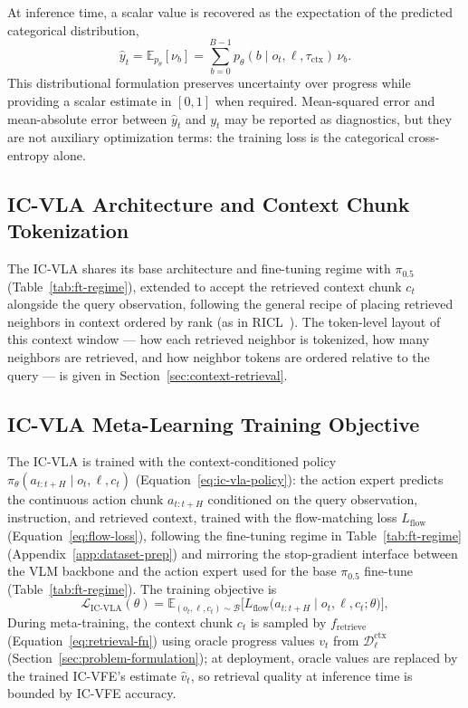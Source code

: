 At inference time, a scalar value is recovered as the expectation of the predicted
categorical distribution,
\begin{equation}
    \hat{y}_t = \mathbb{E}_{p_\theta}[\nu_b] = \sum_{b=0}^{B-1} p_\theta(b \mid o_t, \ell, \tau_{\text{ctx}})\, \nu_b .
\end{equation}
This distributional formulation preserves uncertainty over progress while providing a
scalar estimate in $[0, 1]$ when required. Mean-squared error and mean-absolute error
between $\hat{y}_t$ and $y_t$ may be reported as diagnostics, but they are not
auxiliary optimization terms: the training loss is the categorical cross-entropy
alone.

\subsection{IC-VLA Architecture and Context Chunk Tokenization}
\label{sec:ic-vla-architecture}

The IC-VLA shares its base architecture and fine-tuning regime with $\pi_{0.5}$
(Table~\ref{tab:ft-regime}), extended to accept the retrieved context chunk $c_t$
alongside the query observation, following the general recipe of placing retrieved
neighbors in context ordered by rank (as in RICL~\cite{ricl}). The
token-level layout of this context window --- how each retrieved neighbor is
tokenized, how many neighbors are retrieved, and how neighbor tokens are ordered
relative to the query --- is given in Section~\ref{sec:context-retrieval}.

\subsection{IC-VLA Meta-Learning Training Objective}
\label{sec:ic-vla-objective}

The IC-VLA is trained with the context-conditioned policy $\pi_\theta(a_{t:t+H}
\mid o_t, \ell, c_t)$ (Equation~\ref{eq:ic-vla-policy}): the action expert predicts
the continuous action chunk $a_{t:t+H}$ conditioned on the query observation,
instruction, and retrieved context, trained with the flow-matching loss
$L_{\text{flow}}$ (Equation~\ref{eq:flow-loss}), following the fine-tuning regime in
Table~\ref{tab:ft-regime} (Appendix~\ref{app:dataset-prep}) and mirroring the
stop-gradient interface between the VLM backbone and the action expert used for the
base $\pi_{0.5}$ fine-tune (Table~\ref{tab:ft-regime}). The training objective is
\begin{equation}
    \mathcal{L}_{\mathrm{IC\text{-}VLA}}(\theta)
    = \mathbb{E}_{(o_t, \ell, c_t) \sim \mathcal{B}}
    \Big[L_{\text{flow}}\big(a_{t:t+H} \mid o_t, \ell, c_t; \theta\big)\Big] ,
    \label{eq:ic-vla-loss}
\end{equation}
During
meta-training, the context chunk $c_t$ is sampled by $f_{\text{retrieve}}$
(Equation~\ref{eq:retrieval-fn}) using oracle progress values $v_t$ from
$\mathcal{D}_\ell^{\text{ctx}}$ (Section~\ref{sec:problem-formulation}); at
deployment, oracle values are replaced by the trained IC-VFE's estimate $\hat{v}_t$,
so retrieval quality at inference time is bounded by IC-VFE accuracy. 

